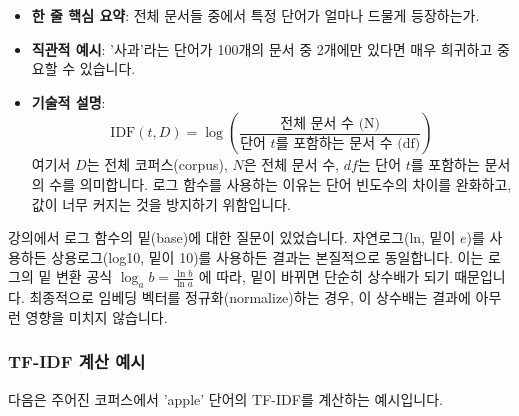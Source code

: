 \documentclass[11pt,a4paper]{article}
\begin{document}
\begin{itemize}
    \item \textbf{한 줄 핵심 요약}: 전체 문서들 중에서 특정 단어가 얼마나 드물게 등장하는가.
    \item \textbf{직관적 예시}: '사과'라는 단어가 100개의 문서 중 2개에만 있다면 매우 희귀하고 중요할 수 있습니다.
    \item \textbf{기술적 설명}:
        \begin{equation*}
        \text{IDF}(t, D) = \log\left(\frac{\text{전체 문서 수 (N)}}{\text{단어 } t \text{를 포함하는 문서 수 (df)}}\right)
        \end{equation*}
        여기서 $D$는 전체 코퍼스(corpus), $N$은 전체 문서 수, $df$는 단어 $t$를 포함하는 문서의 수를 의미합니다. 로그 함수를 사용하는 이유는 단어 빈도수의 차이를 완화하고, 값이 너무 커지는 것을 방지하기 위함입니다.
\end{itemize}

\begin{tipbox}
강의에서 로그 함수의 밑(base)에 대한 질문이 있었습니다. 자연로그(ln, 밑이 $e$)를 사용하든 상용로그(log10, 밑이 10)를 사용하든 결과는 본질적으로 동일합니다. 이는 로그의 밑 변환 공식 $\log_a b = \frac{\ln b}{\ln a}$ 에 따라, 밑이 바뀌면 단순히 상수배가 되기 때문입니다. 최종적으로 임베딩 벡터를 정규화(normalize)하는 경우, 이 상수배는 결과에 아무런 영향을 미치지 않습니다.
\end{tipbox}

\subsubsection{TF-IDF 계산 예시}
다음은 주어진 코퍼스에서 'apple' 단어의 TF-IDF를 계산하는 예시입니다.
\end{document}
